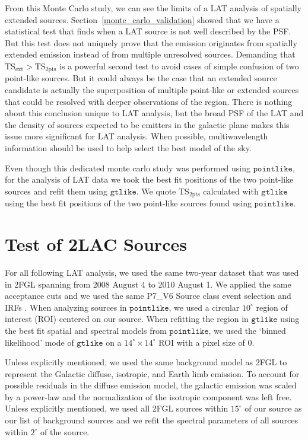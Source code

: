 \documentclass[12pt,preprint]{aastex}
\newcommand{\gev}{\text{GeV}\xspace}
\newcommand{\tsext}{{\ensuremath{\text{TS}_{\text{ext}}}}\xspace}
\newcommand{\tsinc}{\ensuremath{\text{TS}_{\text{2pts}}}\xspace}
\newcommand{\gtlike}{\ensuremath{\mathtt{gtlike}}\xspace}
\newcommand{\pointlike}{\ensuremath{\mathtt{pointlike}}\xspace}
\newcommand{\degree}{^\circ\xspace}
\begin{document}
From this Monte Carlo study, we can see the limits of a LAT analysis
of spatially extended sources.  Section~\ref{monte_carlo_validation}
showed that we have a statistical test that finds when a LAT source is
not well described by the PSF.  But this test does not uniquely prove
that the emission originates from spatially extended emission instead
of from multiple unresolved sources.  Demanding that $\tsext>\tsinc$
is a powerful second test to avoid cases of simple confusion of two
point-like sources. But it could always be the case that an extended
source candidate is actually the superposition of multiple point-like or
extended sources that could be resolved with deeper observations of the
region.  There is nothing about this conclusion unique to LAT analysis,
but the broad PSF of the LAT and the density of sources expected to be
\gev emitters in the galactic plane makes this issue more significant
for LAT analysis.  When possible, multiwavelength information should be
used to help select the best model of the sky.

Even though this dedicated monte carlo study was performed using
\pointlike, for the analysis of LAT data we took the best fit positions
of the two point-like sources and refit them using \gtlike.  We quote
\tsinc calculated with \gtlike using the best fit positions of the two
point-like sources found using \pointlike.

\section{Test of 2LAC Sources}
\label{test_2lac_sources}


For all following LAT analysis, we used the same two-year dataset
that was used in 2FGL spanning from 2008 August 4 to 2010 August 1. We
applied the same acceptance cuts and we used the same P7\_V6 Source class
event selection and IRFs \citep{lat_on_orbit_psf}.  
When analyzing sources in \pointlike, we used a circular $10\degree$ region of
interest (ROI) centered on our source.  
When refitting the region in \gtlike using the best fit spatial and
spectral models from \pointlike, we used the `binned likelihood' mode of
\gtlike on a $14\degree\times14\degree$ ROI with a pixel size of 0.

Unless explicitly
mentioned, we used the same background model as 2FGL to represent the
Galactic diffuse, isotropic, and Earth limb emission.  To account for
possible residuals in the diffuse emission model, the galactic emission
was scaled by a power-law and the normalization
of the isotropic component
was left free.  
Unless explicitly mentioned,
we used all 2FGL sources within $15\degree$ of our source as our list
of background sources and we refit the spectral parameters of all sources
within $2\degree$ of the source.
\end{document}
